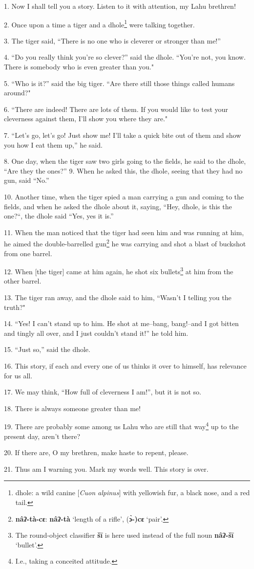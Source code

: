 \setcounter{footnote}{0}


1. Now I shall tell you a story. Listen to it with attention, my Lahu brethren!

2. Once upon a time a tiger and a dhole\footnote{dhole: a wild canine [\textit{Cuon alpinus}] with yellowish fur, a black nose, and a red tail.} were talking together.

3. The tiger said, ``There is no one who is cleverer or stronger than me!''

4. ``Do you really think you're so clever?'' said the dhole. ``You're
not, you know. There is somebody who is even greater than you."

5. ``Who is it?'' said the big tiger. ``Are there still
those things called humans around?"

6. ``There are indeed! There are lots of them. If you would like to test
your cleverness against them, I'll show you where they are."

7. ``Let's go, let's go! Just show me! I'll take a quick bite out of them
and show you how I eat them up,'' he said.

8. One day, when the tiger saw two girls going to the fields, he said to the dhole,
``Are they the ones?'' 9. When he asked this, the dhole, seeing
that they had no gun, said ``No.''

10. Another time, when the tiger spied a man carrying a gun and coming to the fields,
and when he asked the dhole about it, saying, ``Hey, dhole, is this the
one?``, the dhole said ``Yes, yes it is.''

11. When the man noticed that the tiger had seen him and was running at him, he
aimed the double-barrelled gun\footnote{\textbf{nâʔ-tà-cɛ}: \textbf{nâʔ-tà} `length of a rifle', (\textbf{ɔ̀-)cɛ} `pair'.} he was carrying and shot a blast of buckshot
from one barrel.

12. When [the tiger] came at him again, he shot six bullets\footnote{The round-object classifier \textbf{šī} is here used instead of the full noun \textbf{nâʔ-šī} `bullet'.} at him from the
other barrel.

13. The tiger ran away, and the dhole said to him, ``Wasn't I telling you
the truth?"

14. ``Yes! I can't stand up to him. He shot at me--bang, bang!--and I got
bitten and tingly all over, and I just couldn't stand it!'' he told him.

15. ``Just so,'' said the dhole.

16. This story, if each and every one of us thinks it over to himself, has relevance
for us all.

17. We may think, ``How full of cleverness I am!'', but it is not
so.

18. There is always someone greater than me!

19. There are probably some among us Lahu who are still that way\footnote{I.e., taking a conceited attitude.} up to the
present day, aren't there?

20. If there are, O my brethren, make haste to repent, please.

21. Thus am I warning you. Mark my words well. This story is over.

